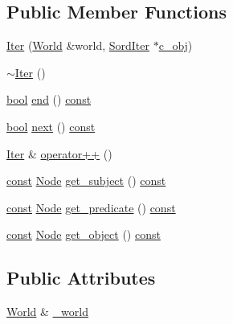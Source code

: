 \subsection*{Public Member Functions}
\begin{DoxyCompactItemize}
\item 
\hyperlink{struct_sord_1_1_iter_a0550ddceddf14813eec2078c7f9bc855}{Iter} (\hyperlink{class_sord_1_1_world}{World} \&world, \hyperlink{group__sord_ga59314650e0ab9b1cdeebc0bf7a0419fa}{Sord\+Iter} $\ast$\hyperlink{class_sord_1_1_wrapper_a71bdf7e679555f72e07c749ab87366c8}{c\+\_\+obj})
\item 
\hyperlink{struct_sord_1_1_iter_a3cd0b73f1cbf620cb51dcd168b9f90ba}{$\sim$\+Iter} ()
\item 
\hyperlink{mac_2config_2i386_2lib-src_2libsoxr_2soxr-config_8h_abb452686968e48b67397da5f97445f5b}{bool} \hyperlink{struct_sord_1_1_iter_a57ef40552b17e6ad6d202ca8f051c10e}{end} () \hyperlink{getopt1_8c_a2c212835823e3c54a8ab6d95c652660e}{const} 
\item 
\hyperlink{mac_2config_2i386_2lib-src_2libsoxr_2soxr-config_8h_abb452686968e48b67397da5f97445f5b}{bool} \hyperlink{struct_sord_1_1_iter_a2780b550dac7a9de758cc7a0215ab7e3}{next} () \hyperlink{getopt1_8c_a2c212835823e3c54a8ab6d95c652660e}{const} 
\item 
\hyperlink{struct_sord_1_1_iter}{Iter} \& \hyperlink{struct_sord_1_1_iter_ad7da822aea9c5017aef00b643d058618}{operator++} ()
\item 
\hyperlink{getopt1_8c_a2c212835823e3c54a8ab6d95c652660e}{const} \hyperlink{class_sord_1_1_node}{Node} \hyperlink{struct_sord_1_1_iter_a78084e25584a28095256367dfbb3fe1e}{get\+\_\+subject} () \hyperlink{getopt1_8c_a2c212835823e3c54a8ab6d95c652660e}{const} 
\item 
\hyperlink{getopt1_8c_a2c212835823e3c54a8ab6d95c652660e}{const} \hyperlink{class_sord_1_1_node}{Node} \hyperlink{struct_sord_1_1_iter_ae12052b58963548381c6984cb6272013}{get\+\_\+predicate} () \hyperlink{getopt1_8c_a2c212835823e3c54a8ab6d95c652660e}{const} 
\item 
\hyperlink{getopt1_8c_a2c212835823e3c54a8ab6d95c652660e}{const} \hyperlink{class_sord_1_1_node}{Node} \hyperlink{struct_sord_1_1_iter_a1403876953bdc956cb1abca9da5f71db}{get\+\_\+object} () \hyperlink{getopt1_8c_a2c212835823e3c54a8ab6d95c652660e}{const} 
\end{DoxyCompactItemize}
\subsection*{Public Attributes}
\begin{DoxyCompactItemize}
\item 
\hyperlink{class_sord_1_1_world}{World} \& \hyperlink{struct_sord_1_1_iter_a2e08cbedee6dcee199cb314e74db1ecb}{\+\_\+world}
\end{DoxyCompactItemize}
